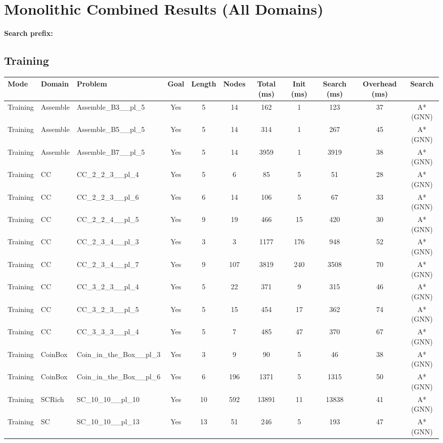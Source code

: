 \documentclass{article}
\begin{document}
\section*{Monolithic Combined Results (All Domains)}
\textbf{Search prefix:} 
\\[0.5cm]
\subsection*{Training}
\begin{tabular}{lllcccccccc}
\toprule
Mode & Domain & Problem & Goal & Length & Nodes & Total (ms) & Init (ms) & Search (ms) & Overhead (ms) & Search \\
\midrule
Training & Assemble & Assemble\_B3\_\_pl\_5 & Yes & 5 & 14 & 162 & 1 & 123 & 37 & A*(GNN) \\
Training & Assemble & Assemble\_B5\_\_pl\_5 & Yes & 5 & 14 & 314 & 1 & 267 & 45 & A*(GNN) \\
Training & Assemble & Assemble\_B7\_\_pl\_5 & Yes & 5 & 14 & 3959 & 1 & 3919 & 38 & A*(GNN) \\
Training & CC & CC\_2\_2\_3\_\_pl\_4 & Yes & 5 & 6 & 85 & 5 & 51 & 28 & A*(GNN) \\
Training & CC & CC\_2\_2\_3\_\_pl\_6 & Yes & 6 & 14 & 106 & 5 & 67 & 33 & A*(GNN) \\
Training & CC & CC\_2\_2\_4\_\_pl\_5 & Yes & 9 & 19 & 466 & 15 & 420 & 30 & A*(GNN) \\
Training & CC & CC\_2\_3\_4\_\_pl\_3 & Yes & 3 & 3 & 1177 & 176 & 948 & 52 & A*(GNN) \\
Training & CC & CC\_2\_3\_4\_\_pl\_7 & Yes & 9 & 107 & 3819 & 240 & 3508 & 70 & A*(GNN) \\
Training & CC & CC\_3\_2\_3\_\_pl\_4 & Yes & 5 & 22 & 371 & 9 & 315 & 46 & A*(GNN) \\
Training & CC & CC\_3\_2\_3\_\_pl\_5 & Yes & 5 & 15 & 454 & 17 & 362 & 74 & A*(GNN) \\
Training & CC & CC\_3\_3\_3\_\_pl\_4 & Yes & 5 & 7 & 485 & 47 & 370 & 67 & A*(GNN) \\
Training & CoinBox & Coin\_in\_the\_Box\_\_pl\_3 & Yes & 3 & 9 & 90 & 5 & 46 & 38 & A*(GNN) \\
Training & CoinBox & Coin\_in\_the\_Box\_\_pl\_6 & Yes & 6 & 196 & 1371 & 5 & 1315 & 50 & A*(GNN) \\
Training & SCRich & SC\_10\_10\_\_pl\_10 & Yes & 10 & 592 & 13891 & 11 & 13838 & 41 & A*(GNN) \\
Training & SC & SC\_10\_10\_\_pl\_13 & Yes & 13 & 51 & 246 & 5 & 193 & 47 & A*(GNN) \\

\end{tabular}
\end{document}
